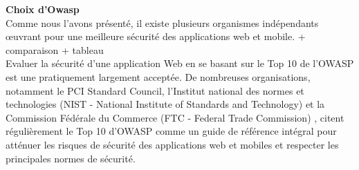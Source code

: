 \textbf{\RIGHTarrow Choix d'Owasp}\\
Comme nous l'avons présenté, il existe plusieurs organismes indépendants œuvrant pour une meilleure sécurité des applications web et mobile. + comparaison + tableau \\
Evaluer la sécurité d’une application Web en se basant sur le Top 10 de l’OWASP est une pratiquement largement acceptée. De nombreuses organisations, notamment le PCI Standard Council, l'Institut national des normes et technologies (NIST - National Institute of Standards and Technology)  et la Commission Fédérale du Commerce (FTC - Federal Trade Commission) , citent régulièrement le Top 10 d'OWASP comme un guide de référence intégral pour atténuer les risques de sécurité des applications web et mobiles et respecter les principales normes de sécurité.